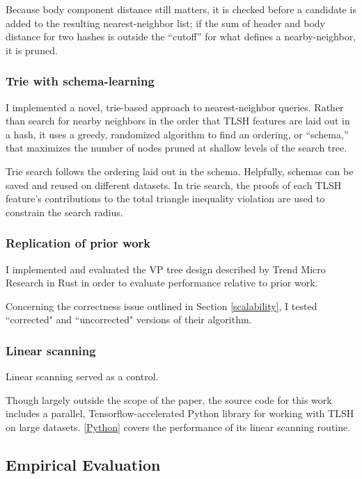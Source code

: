 \documentclass[5p,final]{elsarticle}
\begin{document}
Because body component distance still matters, it is checked before a
candidate is added to the resulting nearest-neighbor list; if the sum
of header and body distance for two hashes is outside the
\enquote{cutoff} for what defines a nearby-neighbor, it is pruned.

\subsubsection{Trie with schema-learning}

I implemented a novel, trie-based \cite{fredkinTrieMemory1960}
approach to nearest-neighbor queries. Rather than search for nearby
neighbors in the order that TLSH features are laid out in a hash,
it uses a greedy, randomized algorithm to find an ordering, or
``schema,'' that maximizes the number of nodes pruned at shallow
levels of the search tree.

Trie search follows the ordering laid out in the schema. Helpfully,
schemas can be saved and reused on different datasets. In trie
search, the proofs of each TLSH feature's contributions to the total
triangle inequality violation are used to constrain the search radius.

\subsubsection{Replication of prior work}

I implemented and evaluated the VP tree design described by
Trend Micro Research \cite{oliverTlshTlshClusterPylib2021} in Rust
in order to evaluate performance relative to prior work.

Concerning the correctness issue outlined in Section \ref{scalability},
I tested ``corrected" and ``uncorrected" versions of their algorithm.

\subsubsection{Linear scanning}

Linear scanning served as a control.

Though largely outside the scope of the paper, the source code for
this work includes a parallel, Tensorflow-accelerated
\cite{martinabadiTensorFlowLargeScaleMachine2015} Python library for
working with TLSH on large datasets. \ref{Python} covers the
performance of its linear scanning routine.

\subsection{Empirical Evaluation}
\end{document}
